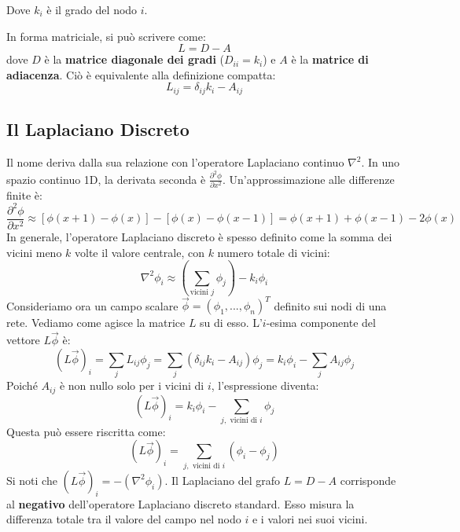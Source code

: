 	Dove $k_i$ è il grado del nodo $i$.
	
	\noindent In forma matriciale, si può scrivere come:
	\begin{equation}
	    L=D-A
	\end{equation}
	dove $D$ è la \textbf{matrice diagonale dei gradi} ($D_{ii} = k_i$) e $A$ è la \textbf{matrice di adiacenza}. Ciò è equivalente alla definizione compatta:
    \begin{equation}
        L_{ij} = \delta_{ij} k_i - A_{ij}
    \end{equation}
	
	
	\subsection{Il Laplaciano Discreto}
	Il nome deriva dalla sua relazione con l'operatore Laplaciano continuo $\nabla^2$.
	In uno spazio continuo 1D, la derivata seconda è $\frac{\partial^2 \phi}{\partial x^2}$. Un'approssimazione alle differenze finite è:
	\begin{equation}
	    \frac{\partial^2 \phi}{\partial x^2} \approx [\phi(x+1) - \phi(x)] - [\phi(x) - \phi(x-1)] = \phi(x+1) + \phi(x-1) - 2\phi(x)
	\end{equation}
	In generale, l'operatore Laplaciano discreto è spesso definito come la somma dei vicini meno $k$ volte il valore centrale, con $k$ numero totale di vicini:
    \begin{equation}
        \nabla^2 \phi_i \approx \left( \sum_{\text{vicini } j} \phi_j \right) - k_i \phi_i
    \end{equation}
	Consideriamo ora un campo scalare $\vec{\phi} = (\phi_1, ..., \phi_n)^T$ definito sui nodi di una rete. Vediamo come agisce la matrice $L$ su di esso. L'$i$-esima componente del vettore $L\vec{\phi}$ è:
    \begin{equation}
        (L\vec{\phi})_i = \sum_{j} L_{ij}\phi_j = \sum_{j} (\delta_{ij}k_i - A_{ij})\phi_j = k_i \phi_i - \sum_{j} A_{ij}\phi_j
    \end{equation}
	Poiché $A_{ij}$ è non nullo solo per i vicini di $i$, l'espressione diventa:
    \begin{equation}
(L\vec{\phi})_i = k_i \phi_i - \sum_{j, \text{ vicini di } i} \phi_j
    \end{equation}
	Questa può essere riscritta come:
    \begin{equation}
        (L\vec{\phi})_i = \sum_{j, \text{ vicini di } i} (\phi_i - \phi_j)
    \end{equation}
	Si noti che $(L\vec{\phi})_i = -(\nabla^2 \phi_i)$. Il Laplaciano del grafo $L = D-A$ corrisponde al \textbf{negativo} dell'operatore Laplaciano discreto standard. Esso misura la differenza totale tra il valore del campo nel nodo $i$ e i valori nei suoi vicini.
	
